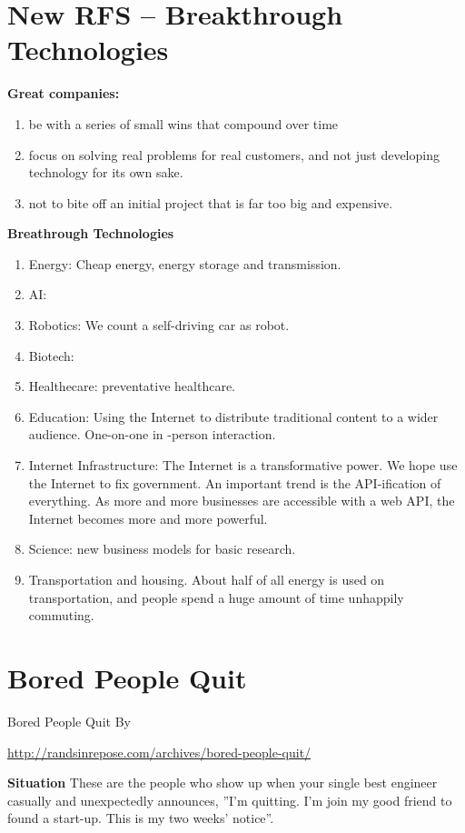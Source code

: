 \section{New RFS -- Breakthrough Technologies}

{\bf Great companies:}
\begin{enumerate}
\item be with a series of small wins that compound over time
\item focus on solving real problems for real customers, and not just developing technology for its own sake.
\item not to bite off an initial project that is far too big and expensive.
\end{enumerate}

{\bf Breathrough Technologies}
\begin{enumerate}
\item Energy: Cheap energy, energy storage and transmission.
\item AI: 
\item Robotics: We count a self-driving car as robot.
\item Biotech:
\item Healthecare: preventative healthcare.
\item Education: Using the Internet to distribute traditional content to a wider audience. One-on-one in -person interaction.
\item Internet Infrastructure: The Internet is a transformative power. We hope use the Internet to fix government. An important trend is the API-ification of everything. As more and more businesses are accessible with a web API, the Internet becomes more and more powerful.
\item Science: new business models for basic research.
\item Transportation and housing. About half of all energy is used on transportation, and people spend a huge amount of time unhappily commuting.
\end{enumerate}

\section{Bored People Quit}
Bored People Quit
By  
\par \url{http://randsinrepose.com/archives/bored-people-quit/}

{\bf Situation}
These are the people who show up when your single best engineer casually
and unexpectedly announces, ''I'm quitting. I'm join my good friend to found a start-up.
This is my two weeks' notice''.

